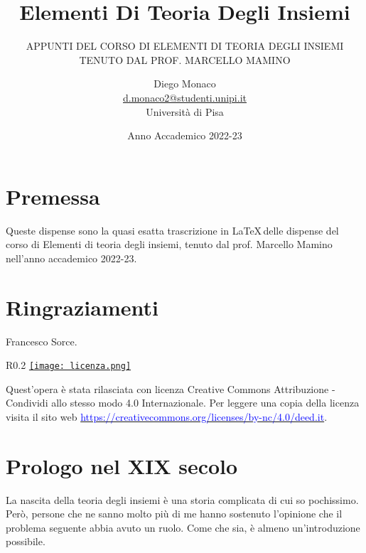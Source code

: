 \documentclass[11pt]{scrartcl}
\begin{document}
\title{Elementi Di Teoria Degli Insiemi}
\subtitle{\large\normalfont\rmfamily\scshape APPUNTI DEL CORSO DI ELEMENTI DI TEORIA DEGLI INSIEMI \\ TENUTO DAL PROF. MARCELLO MAMINO}
\author{Diego Monaco \\ \textnormal{\href{d.monaco2@studenti.unipi.it}{d.monaco2@studenti.unipi.it}} \\ Università di Pisa}
\date{Anno Accademico 2022-23}
\maketitle
\newpage

\tableofcontents
\eject
\newpage

\section*{Premessa}
Queste dispense sono la quasi esatta trascrizione in \LaTeX\,delle dispense del corso di Elementi di teoria degli insiemi, tenuto dal prof. Marcello Mamino nell'anno accademico 2022-23.

\section*{Ringraziamenti}
Francesco Sorce.

\mbox{}
\vfill
\begin{wrapfigure}{R}{0.2\textwidth}
	\centering
	\href{https://creativecommons.org/licenses/by-nc/4.0/deed.it}{\texttt{[image: licenza.png]}}
\end{wrapfigure}

Quest'opera è stata rilasciata con licenza Creative Commons Attribuzione - Condividi allo stesso modo 4.0 Internazionale. Per leggere
una copia della licenza visita il sito web \href{http://creativecommons.org/licenses/by-sa/4.0/deed.it}{\textcolor{blue}{https://creativecommons.org/licenses/by-nc/4.0/deed.it}}.\\

\newpage

\newpage
\section{Prologo nel XIX secolo}
La nascita della teoria degli insiemi è una storia complicata di cui so pochissimo. Però, persone che ne sanno molto più di me hanno sostenuto l'opinione che il problema seguente
abbia avuto un ruolo. Come che sia, è almeno un'introduzione possibile.
\end{document}
